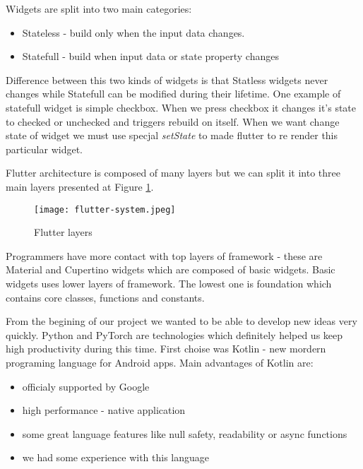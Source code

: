 \documentclass[../Main.tex]{subfiles}
\begin{document}
        
        Widgets are split into two main categories:
        \begin{itemize}
             \item Stateless - build only when the input data changes. 
             \item Statefull - build when input data or state property changes 
        \end{itemize}
        
        Difference between this two kinds of widgets is that Statless widgets 
        never changes while Statefull can be modified during their lifetime.
        One example of statefull widget is simple checkbox. When we press checkbox
        it changes it's state to checked or unchecked and triggers rebuild on itself.
        When we want change state of widget we must use specjal 
        \textit{setState} to made flutter to re render this particular widget.
    
        
        Flutter architecture is composed of many layers but we can split it into 
        three main layers presented at Figure \ref{fig:flutter-layers}.
        \begin{figure}[h]
            \centering
            \texttt{[image: flutter-system.jpeg]}
            \caption{Flutter layers}
            \label{fig:flutter-layers}
        \end{figure}
        Programmers have more contact with top layers of framework - 
        these are Material and Cupertino widgets which are composed of basic widgets.
        Basic widgets uses lower layers of framework. 
        The lowest one is foundation which contains core classes, functions and constants.
    
    
        From the begining of our project we wanted to be able to develop new ideas
        very quickly.
        Python and PyTorch are technologies which definitely helped us keep high
        productivity during this time. First choise was Kotlin - new mordern programing 
        language for Android apps. Main advantages of Kotlin are:
            \begin{itemize}
                \item officialy supported by Google
                \item high performance - native application
                \item some great language features like null safety, readability or async functions
                \item we had some experience with this language
            \end{itemize}
            
\end{document}
